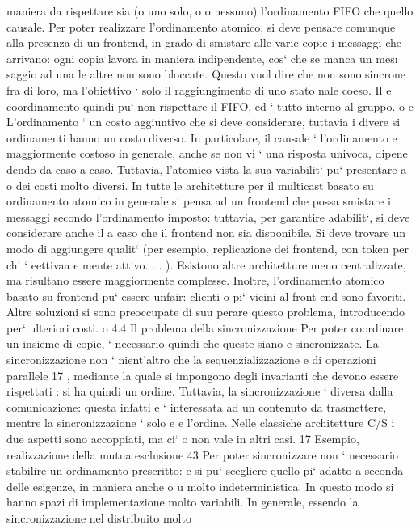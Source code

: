 \documentclass[a4paper,12pt]{article}
\begin{document}
maniera da rispettare sia (o uno solo, o
o
nessuno) l'ordinamento FIFO che quello causale.
Per poter realizzare l'ordinamento atomico, si deve pensare comunque alla
presenza di un frontend, in grado di smistare alle varie copie i messaggi che
arrivano: ogni copia lavora in maniera indipendente, cos` che se manca un mes\i{}
saggio ad una le altre non sono bloccate. Questo vuol dire che non sono sincrone
fra di loro, ma l'obiettivo ` solo il raggiungimento di uno stato nale coeso. Il
e
coordinamento quindi pu` non rispettare il FIFO, ed ` tutto interno al gruppo.
o
e
L'ordinamento ` un costo aggiuntivo che si deve considerare, tuttavia i divere
si ordinamenti hanno un costo diverso. In particolare, il causale ` l'ordinamento
e
maggiormente costoso in generale, anche se non vi ` una risposta univoca, dipene
dendo da caso a caso. Tuttavia, l'atomico vista la sua variabilit` pu` presentare
a o
dei costi molto diversi.
In tutte le architetture per il multicast basato su ordinamento atomico in
generale si pensa ad un frontend che possa smistare i messaggi secondo l'ordinamento imposto: tuttavia, per garantire
adabilit`, si deve considerare anche il
a
caso che il frontend non sia disponibile. Si deve trovare un modo di aggiungere
qualit` (per esempio, replicazione dei frontend, con token per chi ` eettivaa
e
mente attivo. . . ). Esistono altre architetture meno centralizzate, ma risultano
essere maggiormente complesse.
Inoltre, l'ordinamento atomico basato su frontend pu` essere unfair: clienti
o
pi` vicini al front end sono favoriti. Altre soluzioni si sono preoccupate di suu
perare questo problema, introducendo per` ulteriori costi.
o
4.4
Il problema della sincronizzazione
Per poter coordinare un insieme di copie, ` necessario quindi che queste siano
e
sincronizzate. La sincronizzazione non ` nient'altro che la sequenzializzazione
e
di operazioni parallele 17 , mediante la quale si impongono degli invarianti che
devono essere rispettati : si ha quindi un ordine.
Tuttavia, la sincronizzazione ` diversa dalla comunicazione: questa infatti
e
` interessata ad un contenuto da trasmettere, mentre la sincronizzazione ` solo
e
e
l'ordine. Nelle classiche architetture C/S i due aspetti sono accoppiati, ma ci`
o
non vale in altri casi.
17 Esempio,
realizzazione della mutua esclusione
43
Per poter sincronizzare non ` necessario stabilire un ordinamento prescritto:
e
si pu` scegliere quello pi` adatto a seconda delle esigenze, in maniera anche
o
u
molto indeterministica. In questo modo si hanno spazi di implementazione
molto variabili. In generale, essendo la sincronizzazione nel distribuito molto
\end{document}
